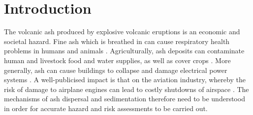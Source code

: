 \documentclass[authoryear,preprint,review,12pt]{elsarticle}
\begin{document}
\begin{frontmatter}
\begin{keyword}



\end{keyword}

\end{frontmatter}


\section{Introduction}
\label{sec:intro}

The volcanic ash produced by explosive volcanic eruptions is an economic and societal hazard. Fine ash which is breathed in can cause respiratory health problems in humans and animals \citep{Kampa07, Anderson12, WHO13, Baxter15}. Agriculturally, ash deposits can contaminate human and livestock food and water supplies, as well as cover crops \citep{Cook81, Cronin98, Wilson11, Craig16}. More generally, ash can cause buildings to collapse and damage electrical power systems \citep{Wilson14, Craig16}. A well-publicised impact is that on the aviation industry, whereby the risk of damage to airplane engines can lead to costly shutdowns of airspace \citep{Budd11, Elissondo16}. The mechanisms of ash dispersal and sedimentation therefore need to be understood in order for accurate hazard and risk assessments to be carried out.
\end{document}
